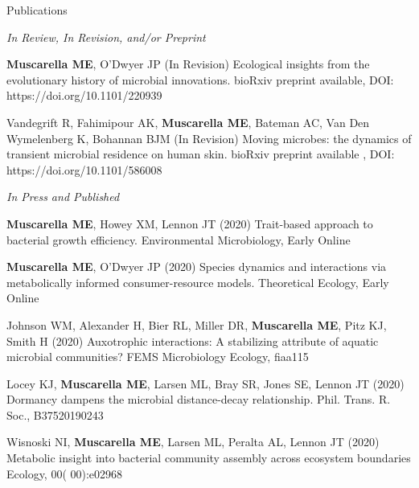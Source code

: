 \documentclass{resume} %
\begin{document}
\pagebreak



\begin{rSection}{Publications}

\emph{In Review, In Revision, and/or Preprint}

{\bf Muscarella ME}, O'Dwyer JP (In Revision) 
Ecological insights from the evolutionary history of microbial innovations. 
bioRxiv preprint available, DOI: https://doi.org/10.1101/220939 

Vandegrift R, Fahimipour AK, {\bf Muscarella ME}, Bateman AC, Van Den Wymelenberg K, 
Bohannan BJM (In Revision)
Moving microbes: the dynamics of transient microbial residence on human skin.
bioRxiv preprint available , DOI: https://doi.org/10.1101/586008 

\emph{In Press and Published}

{\bf Muscarella ME}, Howey XM, Lennon JT (2020) 
Trait-based approach to bacterial growth efficiency. 
Environmental Microbiology, Early Online

{\bf Muscarella ME}, O'Dwyer JP (2020) 
Species dynamics and interactions via metabolically informed consumer-resource models. 
Theoretical Ecology, Early Online

Johnson WM, Alexander H, Bier RL, Miller DR, {\bf Muscarella ME}, Pitz KJ, Smith H (2020)
Auxotrophic interactions: A stabilizing attribute of aquatic microbial communities?
FEMS Microbiology Ecology, fiaa115

Locey KJ, {\bf Muscarella ME}, Larsen ML, Bray SR, Jones SE, Lennon JT (2020)
Dormancy dampens the microbial distance-decay relationship.
Phil. Trans. R. Soc., B37520190243

Wisnoski NI, {\bf Muscarella ME}, Larsen ML, Peralta AL, Lennon JT (2020)
Metabolic insight into bacterial community assembly across ecosystem boundaries
Ecology, 00( 00):e02968


\end{rSection}
\end{document}
